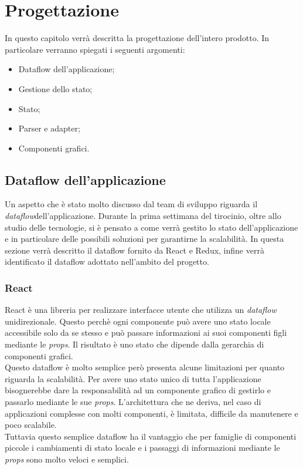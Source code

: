 
\chapter{Progettazione}
\label{cap:progettazione}

In questo capitolo verrà descritta la progettazione dell'intero prodotto. In particolare verranno spiegati i seguenti argomenti:
\begin{itemize}
	\item Dataflow dell'applicazione;
	\item Gestione dello stato;
	\item Stato;
	\item Parser e adapter;
	\item Componenti grafici.
\end{itemize}

\section{Dataflow dell'applicazione}
Un aspetto che è stato molto discusso dal team di sviluppo riguarda il \emph{dataflow}\glosp dell'applicazione. Durante la prima settimana del tirocinio, oltre allo studio delle tecnologie, si è pensato a come verrà gestito lo stato dell'applicazione e in particolare delle possibili soluzioni per garantirne la scalabilità. In questa sezione verrà descritto il dataflow fornito da React e Redux, infine verrà identificato il dataflow adottato nell'ambito del progetto.

\subsection{React}
React è una libreria per realizzare interfacce utente che utilizza un \emph{dataflow} unidirezionale. Questo perchè ogni componente può avere uno stato locale accessibile solo da se stesso e può passare informazioni ai suoi componenti figli mediante le \emph{props}\glo. Il risultato è uno stato che dipende dalla gerarchia di componenti grafici. \\
Questo dataflow è molto semplice però presenta alcune limitazioni per quanto riguarda la scalabilità. Per avere uno stato unico di tutta l'applicazione bisognerebbe dare la responsabilità ad un componente grafico di gestirlo e passarlo mediante le sue \emph{props}. L'architettura che ne deriva, nel caso di applicazioni complesse con molti componenti, è limitata, difficile da manutenere e poco scalabile. \\
Tuttavia questo semplice dataflow ha il vantaggio che per famiglie di componenti piccole i cambiamenti di stato locale e i passaggi di informazioni mediante le \emph{props} sono molto veloci e semplici.


